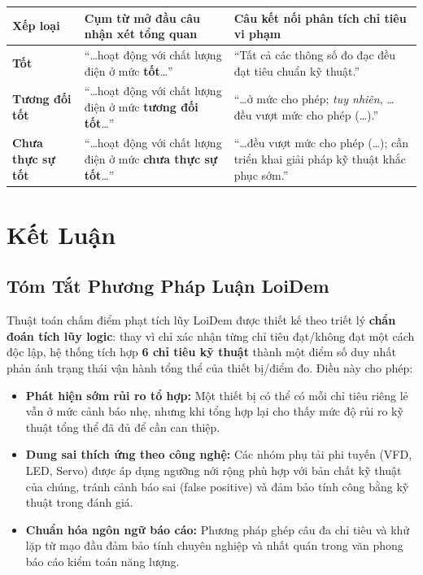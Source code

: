 \documentclass[12pt,a4paper]{article}
\begin{document}
\begin{center}
\small
\setlength{\tabcolsep}{4pt}
\begin{tabularx}{\textwidth}{>{\centering\arraybackslash}p{2.5cm}
                              >{\raggedright\arraybackslash}X
                              >{\raggedright\arraybackslash}X}
\toprule
\rowcolor{primary}
\color{white}\textbf{Xếp loại} &
\color{white}\textbf{Cụm từ mở đầu câu nhận xét tổng quan} &
\color{white}\textbf{Câu kết nối phân tích chỉ tiêu vi phạm} \\
\midrule
\textbf{\color{darkgreen}Tốt} &
``\ldots hoạt động với chất lượng điện ở mức \textbf{tốt}\ldots'' &
``Tất cả các thông số đo đạc đều đạt tiêu chuẩn kỹ thuật.'' \\
\rowcolor{lightgray}
\textbf{\color{warningyellow}Tương đối tốt} &
``\ldots hoạt động với chất lượng điện ở mức \textbf{tương đối tốt}\ldots'' &
``\ldots ở mức cho phép; \textit{tuy nhiên}, \ldots đều vượt mức cho phép (\ldots).'' \\
\textbf{\color{accent}Chưa thực sự tốt} &
``\ldots hoạt động với chất lượng điện ở mức \textbf{chưa thực sự tốt}\ldots'' &
``\ldots đều vượt mức cho phép (\ldots); cần triển khai giải pháp kỹ thuật khắc phục sớm.'' \\
\bottomrule
\end{tabularx}
\end{center}

\clearpage
\section{Kết Luận}

\subsection{Tóm Tắt Phương Pháp Luận LoiDem}

Thuật toán chấm điểm phạt tích lũy LoiDem được thiết kế theo triết lý \textbf{chẩn đoán tích lũy logic}: thay vì chỉ xác nhận từng chỉ tiêu đạt/không đạt một cách độc lập, hệ thống tích hợp \textbf{6 chỉ tiêu kỹ thuật} thành một điểm số duy nhất phản ánh trạng thái vận hành tổng thể của thiết bị/điểm đo. Điều này cho phép:

\begin{itemize}
  \item \textbf{Phát hiện sớm rủi ro tổ hợp:} Một thiết bị có thể có mỗi chỉ tiêu riêng lẻ vẫn ở mức cảnh báo nhẹ, nhưng khi tổng hợp lại cho thấy mức độ rủi ro kỹ thuật tổng thể đã đủ để cần can thiệp.
  \item \textbf{Dung sai thích ứng theo công nghệ:} Các nhóm phụ tải phi tuyến (VFD, LED, Servo) được áp dụng ngưỡng nới rộng phù hợp với bản chất kỹ thuật của chúng, tránh cảnh báo sai (false positive) và đảm bảo tính công bằng kỹ thuật trong đánh giá.
  \item \textbf{Chuẩn hóa ngôn ngữ báo cáo:} Phương pháp ghép câu đa chỉ tiêu và khử lặp từ mạo đầu đảm bảo tính chuyên nghiệp và nhất quán trong văn phong báo cáo kiểm toán năng lượng.
\end{itemize}
\end{document}
